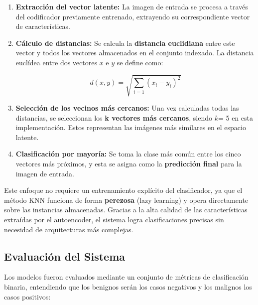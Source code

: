 \documentclass[12pt]{article} %
\begin{document}
\begin{enumerate}
    \item \textbf{Extracción del vector latente:} La imagen de entrada se procesa a través del codificador previamente entrenado, extrayendo su correspondiente vector de características.
    
    \item \textbf{Cálculo de distancias:} Se calcula la \textbf{distancia euclidiana} entre este vector y todos los vectores almacenados en el conjunto indexado. La distancia euclídea entre dos vectores \( x \) e \( y \) se define como:
    
    \begin{equation}
        d(x, y) = \sqrt{ \sum_{i=1} (x_i - y_i)^2 }
    \end{equation}

    \item \textbf{Selección de los vecinos más cercanos:} Una vez calculadas todas las distancias, se seleccionan los \textbf{k vectores más cercanos}, siendo \(k \)= 5 en esta implementación. Estos representan las imágenes más similares en el espacio latente.
    \item \textbf{Clasificación por mayoría:} Se toma la clase más común entre los cinco vectores más próximos, y esta se asigna como la \textbf{predicción final} para la imagen de entrada.

\end{enumerate}

Este enfoque no requiere un entrenamiento explícito del clasificador, ya que el método KNN funciona de forma \textbf{perezosa} (lazy learning) y opera directamente sobre las instancias almacenadas. Gracias a la alta calidad de las características extraídas por el autoencoder, el sistema logra clasificaciones precisas sin necesidad de arquitecturas más complejas.

\subsection{Evaluación del Sistema}
Los modelos fueron evaluados mediante un conjunto de métricas de clasificación binaria, entendiendo que los benignos serán los casos negativos y los malignos los casos positivos:
\end{document}
